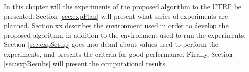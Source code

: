In this chapter will the experiments of the proposed algorithm to the UTRP be presented. Section \vref{sec:expPlan} will present what series of experiments are planned. Section xx describes the environment used in order to develop the proposed algorithm, in addition to the environment used to run the experiments. Section \vref{sec:expSetup} goes into detail about values used to perform the experiments, and presents the criteria for good performance. Finally, Section \vref{sec:expResults} will present the computational results. 

 

